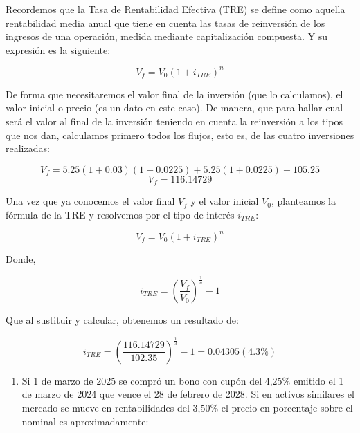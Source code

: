 \documentclass[
  letterpaper,
  DIV=11,
  numbers=noendperiod]{scrartcl}
\providecommand{\tightlist}{%
  \setlength{\itemsep}{0pt}\setlength{\parskip}{0pt}}\usepackage{longtable,booktabs,array}
\begin{document}
\begin{tcolorbox}[enhanced jigsaw, colframe=quarto-callout-note-color-frame, opacityback=0, colback=white, leftrule=.75mm, left=2mm, breakable, arc=.35mm, rightrule=.15mm, toprule=.15mm, bottomrule=.15mm]
\begin{minipage}[t]{5.5mm}
\textcolor{quarto-callout-note-color}{\faInfo}
\end{minipage}%
\begin{minipage}[t]{\textwidth - 5.5mm}

Recordemos que la Tasa de Rentabilidad Efectiva (TRE) se define como
aquella rentabilidad media anual que tiene en cuenta las tasas de
reinversión de los ingresos de una operación, medida mediante
capitalización compuesta. Y su expresión es la siguiente:

\[V_f=V_0\left(1+i_{TRE}\right)^n\]

De forma que necesitaremos el valor final de la inversión (que lo
calculamos), el valor inicial o precio (es un dato en este caso). De
manera, que para hallar cual será el valor al final de la inversión
teniendo en cuenta la reinversión a los tipos que nos dan, calculamos
primero todos los flujos, esto es, de las cuatro inversiones realizadas:

\[V_f=5.25\left(1+0.03\right)\left(1+0.0225\right)+5.25\left(1+0.0225\right)+105.25\]
\[V_f=116.14729\]

Una vez que ya conocemos el valor final \(V_f\) y el valor inicial
\(V_0\), planteamos la fórmula de la TRE y resolvemos por el tipo de
interés \(i_{TRE}\):

\[V_f=V_0\left(1+i_{TRE}\right)^n\]

Donde,

\[i_{TRE}=\left(\frac{V_f }{V_0}\right)^{\frac{1 }{n }}-1\]

Que al sustituir y calcular, obtenemos un resultado de:

\[i_{TRE}=\left(\frac{116.14729}{102.35}\right)^{\frac{1}{3}}-1=0.04305(4.3\%)\]

\end{minipage}%
\end{tcolorbox}

\begin{enumerate}
\def\labelenumi{\arabic{enumi}.}
\setcounter{enumi}{2}
\tightlist
\item
  Si 1 de marzo de 2025 se compró un bono con cupón del 4,25\% emitido
  el 1 de marzo de 2024 que vence el 28 de febrero de 2028. Si en
  activos similares el mercado se mueve en rentabilidades del 3,50\% el
  precio en porcentaje sobre el nominal es aproximadamente:
\end{enumerate}
\end{document}
